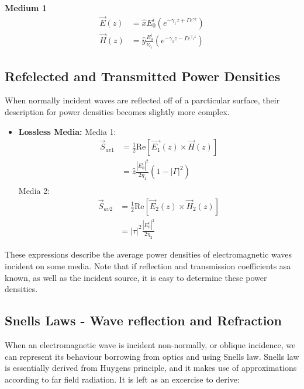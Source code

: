 \documentclass{book}
\begin{document}
\textbf{Medium 1}
\begin{align*}
	\vec{E}(z) &= \hat{x} E_0 ^i (e^{-\gamma_1 z + \Gamma e^{\gamma z}}) \\
	\vec{H}(z) &= \hat{y} \frac{E_0^i}{\nu_{c_1}} (e^{-\gamma_1z-\Gamma e^{\gamma_1z}})
\end{align*}

\subsection{Refelected and Transmitted Power Densities}

When normally incident waves are reflected off of a parcticular surface, their description for power densities becomes slightly more complex. 

\begin{itemize}
	\item \textbf{Lossless Media:} \newline	
	Media 1:
	\begin{align*}
		\vec{S}_{av1} &= \frac{1}{2} \text{Re}[\vec{E_1} (z) \times \vec{H}(z)] \\
		&= \hat{z} \frac{|E_0 ^i|^2}{2\eta_1} (1 - |\Gamma|^2) \\
	\end{align*}
	Media 2:
	\begin{align*}
		\vec{S}_{av2} &= \frac{1}{2} \text{Re}[\vec{E}_2 (z) \times \vec{H}_2(z)]\\
		&= |\tau|^2\frac{|E_0^i|^2}{2\eta_2} 
	\end{align*}
\end{itemize}

These expressions describe the average power densities of electromagnetic waves incident on some media. Note that if reflection and transmission coefficients asa known, as well as the incident source, it is easy to determine these power densities.

\subsection{Snells Laws - Wave reflection and Refraction}

When an electromagnetic wave is incident non-normally, or oblique incidence, we can represent its behaviour borrowing from optics and using Snells law. Snells law is essentially derived from Huygens principle, and it makes use of approximations according to far field radiation. It is left as an excercise to derive:
\end{document}
